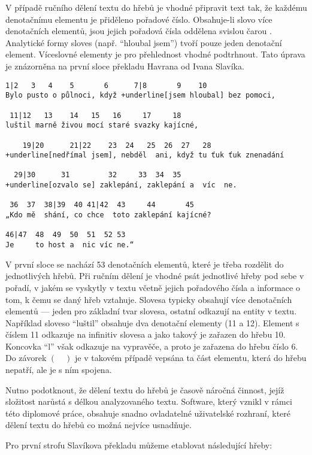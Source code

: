\documentclass[dp.tex]{subfiles}
\begin{document}
V případě ručního dělení textu do hřebů je vhodné připravit text tak, že každému denotačnímu elementu je přiděleno pořadové číslo. Obsahuje-li slovo více denotačních elementů, jsou jejich pořadová čísla oddělena svislou čarou \uv{|}. Analytické formy sloves (např. \enquote{hloubal jsem}) tvoří pouze jeden denotační element. Víceslovné elementy je pro přehlednost vhodné podtrhnout. Tato úprava je znázorněna na první sloce překladu Havrana od Ivana Slavíka.

\begin{Verbatim}[commandchars=+\[\]]
 1|2   3   4    5       6      7|8       9    10
Bylo pusto o půlnoci, když +underline[jsem hloubal] bez pomoci,

 11|12   13    14   15   16     17     18
luštil marně živou mocí staré svazky kajícné,

    19|20      21|22    23  24   25  26  27   28
+underline[nedřímal jsem], nebděl  ani, když tu ťuk ťuk znenadání

  29|30      31         32     33  34  35
+underline[ozvalo se] zaklepání, zaklepání a  víc  ne.

 36  37  38|39  40 41|42  43     44       45
„Kdo mě  shání, co chce  toto zaklepání kajícné?

46|47  48  49  50  51  52 53
Je     to host a  nic víc ne.“
\end{Verbatim}

V první sloce se nachází 53 denotačních elementů, které je třeba rozdělit do jednotlivých hřebů. Při ručním dělení je vhodné psát jednotlivé hřeby pod sebe v pořadí, v jakém se vyskytly v textu včetně jejich pořadového čísla a informace o tom, k čemu se daný hřeb vztahuje. Slovesa typicky obsahují více denotačních elementů --- jeden pro základní tvar slovesa, ostatní odkazují na entity v textu. Například sloveso \enquote{luštil} obsahuje dva denotační elementy (11 a 12). Element s číslem 11 odkazuje na infinitiv slovesa a jako takový je zařazen do hřebu 10. Koncovka \enquote{l} však odkazuje na vypravěče, a proto je zařazena do hřebu číslo 6. Do závorek $(\quad )$ je v takovém případě vepsána ta část  elementu, která do hřebu nepatří, ale je s ním spojena.

Nutno podotknout, že dělení textu do hřebů je časově náročná činnost, jejíž složitost narůstá s délkou analyzovaného textu. Software, který vznikl v rámci této diplomové práce, obsahuje snadno ovladatelné uživatelské rozhraní, které dělení textu do hřebů co možná nejvíce usnadňuje.

Pro první strofu Slavíkova překladu můžeme etablovat následující hřeby:
\end{document}
